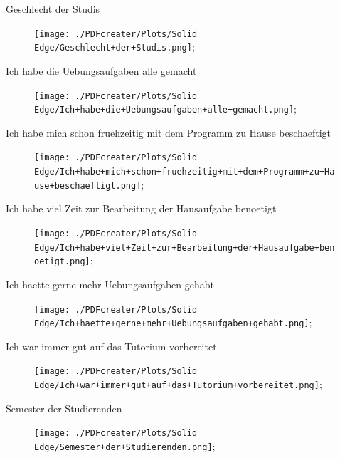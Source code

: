 \documentclass[10pt]{beamer}
\begin{document}
\begin{frame}[fragile]{Geschlecht der Studis} 
 \begin{figure}
 \texttt{[image: ./PDFcreater/Plots/Solid Edge/Geschlecht+der+Studis.png]};
 \end{figure}
 \end{frame}
\begin{frame}[fragile]{Ich habe die Uebungsaufgaben alle gemacht} 
 \begin{figure}
 \texttt{[image: ./PDFcreater/Plots/Solid Edge/Ich+habe+die+Uebungsaufgaben+alle+gemacht.png]};
 \end{figure}
 \end{frame}
\begin{frame}[fragile]{Ich habe mich schon fruehzeitig mit dem Programm zu Hause beschaeftigt} 
 \begin{figure}
 \texttt{[image: ./PDFcreater/Plots/Solid Edge/Ich+habe+mich+schon+fruehzeitig+mit+dem+Programm+zu+Hause+beschaeftigt.png]};
 \end{figure}
 \end{frame}
\begin{frame}[fragile]{Ich habe viel Zeit zur Bearbeitung der Hausaufgabe benoetigt} 
 \begin{figure}
 \texttt{[image: ./PDFcreater/Plots/Solid Edge/Ich+habe+viel+Zeit+zur+Bearbeitung+der+Hausaufgabe+benoetigt.png]};
 \end{figure}
 \end{frame}
\begin{frame}[fragile]{Ich haette gerne mehr Uebungsaufgaben gehabt} 
 \begin{figure}
 \texttt{[image: ./PDFcreater/Plots/Solid Edge/Ich+haette+gerne+mehr+Uebungsaufgaben+gehabt.png]};
 \end{figure}
 \end{frame}
\begin{frame}[fragile]{Ich war immer gut auf das Tutorium vorbereitet} 
 \begin{figure}
 \texttt{[image: ./PDFcreater/Plots/Solid Edge/Ich+war+immer+gut+auf+das+Tutorium+vorbereitet.png]};
 \end{figure}
 \end{frame}
\begin{frame}[fragile]{Semester der Studierenden} 
 \begin{figure}
 \texttt{[image: ./PDFcreater/Plots/Solid Edge/Semester+der+Studierenden.png]};
 \end{figure}
 \end{frame}
\end{document}
